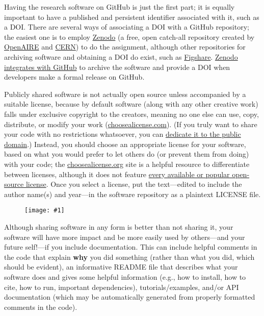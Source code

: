 \documentclass{article}
\newlength{\imgwidth}
\newcommand\scaledgraphics[2]{%
                
\settowidth{\imgwidth}{\texttt{[image: \#1]}}%
                
\setlength{\imgwidth}{\minof{\imgwidth}{#2\textwidth}}%
                
\texttt{[image: \#1]}%
                
}
\begin{document}
Having the research software on GitHub is just the first part; it is equally important to have a published and persistent identifier associated with it, such as a DOI. There are several ways of associating a DOI with a GitHub repository; the easiest one is to employ \href{www.https://zenodo.org/}{Zenodo} (a free, open catch-all repository created by \href{https://www.openaire.eu/}{OpenAIRE} and \href{https://home.cern/}{CERN}) to do the assignment, although other repositories for archiving software and obtaining a DOI do exist, such as \href{https://figshare.com/}{Figshare}. \href{https://guides.github.com/activities/citable-code/}{Zenodo integrates with GitHub} to archive the software and provide a DOI when developers make a formal release on GitHub.


Publicly shared software is not actually open source unless accompanied by a suitable license, because by default software (along with any other creative work) falls under exclusive copyright to the creators, meaning no one else can use, copy, distribute, or modify your work (\href{https://choosealicense.com/no-permission/}{choosealicense.com}). (If you truly want to share your code with no restrictions whatsoever, you can \href{https://choosealicense.com/licenses/#unlicense}{dedicate it to the public domain}.) Instead, you should choose an appropriate license for your software, based on what you would prefer to let others do (or prevent them from doing) with your code; the \href{https://choosealicense.com/}{choosealicense.org} site is a helpful resource to differentiate between licenses, although it does not feature \href{https://opensource.org/licenses}{every available or popular open-source license}. Once you select a license, put the text—edited to include the author name(s) and year—in the software repository as a plaintext LICENSE file.

\begin{figure}
\scaledgraphics{9ab281cb-d441-4a36-9e69-88917d934921.png}{1}
\label{F47556491}
\end{figure}


Although sharing software in any form is better than not sharing it, your software will have more impact and be more easily used by others—and your future self!—if you include documentation. This can include helpful comments in the code that explain \textbf{why} you did something (rather than what you did, which should be evident), an informative README file that describes what your software does and gives some helpful information (e.g., how to install, how to cite, how to run, important dependencies), tutorials/examples, and/or API documentation (which may be automatically generated from properly formatted comments in the code).
\end{document}
